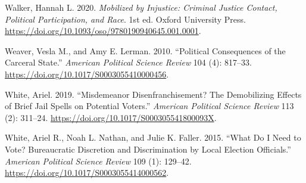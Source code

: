 \documentclass[
  12pt,
]{article}
\newlength{\cslhangindent}
\newenvironment{cslreferences}%
  {\setlength{\parindent}{0pt}%
  \everypar{\setlength{\hangindent}{\cslhangindent}}\ignorespaces}%
  {\par}
\begin{document}
\begin{cslreferences}
\leavevmode\hypertarget{ref-Walker2020a}{}%
Walker, Hannah L. 2020. \emph{Mobilized by Injustice: Criminal Justice Contact, Political Participation, and Race}. 1st ed. Oxford University Press. \url{https://doi.org/10.1093/oso/9780190940645.001.0001}.

\leavevmode\hypertarget{ref-Weaver2010}{}%
Weaver, Vesla M., and Amy E. Lerman. 2010. ``Political Consequences of the Carceral State.'' \emph{American Political Science Review} 104 (4): 817--33. \url{https://doi.org/10.1017/S0003055410000456}.

\leavevmode\hypertarget{ref-White2019}{}%
White, Ariel. 2019. ``Misdemeanor Disenfranchisement? The Demobilizing Effects of Brief Jail Spells on Potential Voters.'' \emph{American Political Science Review} 113 (2): 311--24. \url{https://doi.org/10.1017/S000305541800093X}.

\leavevmode\hypertarget{ref-White2015}{}%
White, Ariel R., Noah L. Nathan, and Julie K. Faller. 2015. ``What Do I Need to Vote? Bureaucratic Discretion and Discrimination by Local Election Officials.'' \emph{American Political Science Review} 109 (1): 129--42. \url{https://doi.org/10.1017/S0003055414000562}.
\end{cslreferences}
\end{document}
